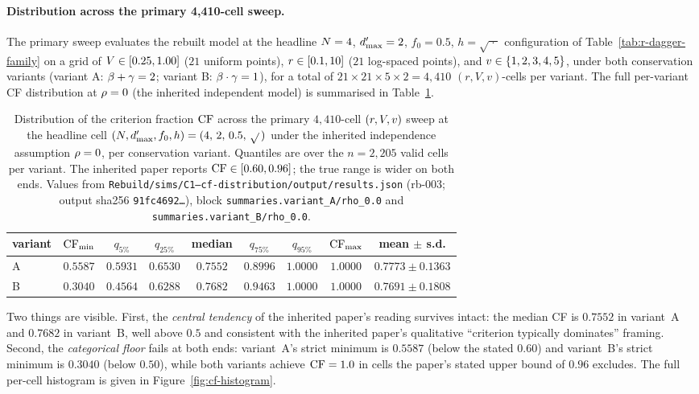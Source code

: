 \paragraph{Distribution across the primary 4{,}410-cell sweep.}
The primary sweep evaluates the rebuilt model at the headline
$N = 4$, $d'_{\max} = 2$, $f_0 = 0.5$, $h = \sqrt{\;\cdot\;}$
configuration of Table~\ref{tab:r-dagger-family} on a grid of
$V \in [0.25, 1.00]$ ($21$ uniform points),
$r \in [0.1, 10]$ ($21$ log-spaced points), and $v \in
\{1, 2, 3, 4, 5\}$, under both conservation variants (variant A:
$\beta + \gamma = 2$; variant B: $\beta \cdot \gamma = 1$), for
a total of $21 \times 21 \times 5 \times 2 = 4{,}410$
$(r,V,v)$-cells per variant. The full per-variant CF distribution at
$\rho = 0$ (the inherited independent model) is summarised in
Table~\ref{tab:cf-distribution}.
%
\begin{table}[t]
  \centering
  \small
  \begin{tabular}{l c c c c c c c c}
    \toprule
    variant & $\mathrm{CF}_{\min}$ & $q_{5\%}$ & $q_{25\%}$ & median &
    $q_{75\%}$ & $q_{95\%}$ & $\mathrm{CF}_{\max}$ & mean $\pm$ s.d.\\
    \midrule
    A & $0.5587$ & $0.5931$ & $0.6530$ & $\mathbf{0.7552}$
      & $0.8996$ & $1.0000$ & $1.0000$
      & $0.7773 \pm 0.1363$\\
    B & $\mathbf{0.3040}$ & $0.4564$ & $0.6288$ & $\mathbf{0.7682}$
      & $0.9463$ & $1.0000$ & $1.0000$
      & $0.7691 \pm 0.1808$\\
    \bottomrule
  \end{tabular}
  \caption{Distribution of the criterion fraction $\mathrm{CF}$ across the
  primary $4{,}410$-cell $(r, V, v)$ sweep at the
  headline cell $(N, d'_{\max}, f_0, h) =
  (4,\, 2,\, 0.5,\, \sqrt{}\,)$ under the inherited
  independence assumption $\rho = 0$, per conservation variant.
  Quantiles are over the $n = 2{,}205$ valid cells per variant.
  The inherited paper reports $\mathrm{CF} \in [0.60, 0.96]$; the true
  range is wider on both ends. Values from
  \texttt{Rebuild/sims/C1--cf-distribution/output/results.json}
  (rb-003; output sha256 \texttt{91fc4692\ldots}), block
  \texttt{summaries.variant\_A/rho\_0.0} and
  \texttt{summaries.variant\_B/rho\_0.0}.}
  \label{tab:cf-distribution}
\end{table}
%
Two things are visible. First, the \emph{central tendency} of the
inherited paper's reading survives intact: the median CF is
$0.7552$ in variant~A and $0.7682$ in variant~B, well above $0.5$
and consistent with the inherited paper's qualitative ``criterion
typically dominates'' framing. Second, the \emph{categorical floor}
fails at both ends: variant~A's strict minimum is $0.5587$ (below
the stated $0.60$) and variant~B's strict minimum is $0.3040$
(below $0.50$), while both variants achieve $\mathrm{CF} = 1.0$ in cells the
paper's stated upper bound of $0.96$ excludes. The full per-cell
histogram is given in Figure~\ref{fig:cf-histogram}.

